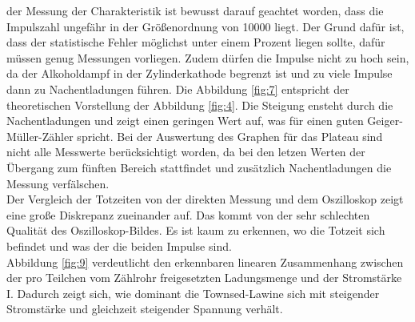 \justifying der Messung der Charakteristik ist bewusst darauf geachtet worden, dass
die Impulszahl ungefähr in der Größenordnung von 10000 liegt. Der Grund dafür ist,
dass der statistische Fehler möglichst unter einem Prozent liegen sollte, dafür müssen genug Messungen
vorliegen. Zudem dürfen die Impulse nicht zu hoch sein, da der Alkoholdampf in der
Zylinderkathode begrenzt ist und zu viele Impulse dann zu Nachentladungen führen.
Die Abbildung \ref{fig:7} entspricht der theoretischen Vorstellung der Abbildung 
\ref{fig:4}. Die Steigung ensteht durch die Nachentladungen und zeigt einen
geringen Wert auf, was für einen guten Geiger-Müller-Zähler spricht.
Bei der Auswertung des Graphen für das Plateau sind nicht alle Messwerte 
berücksichtigt worden, da bei den letzen Werten der Übergang zum
fünften Bereich stattfindet und zusätzlich Nachentladungen die Messung
verfälschen. \\
Der Vergleich der Totzeiten von der direkten Messung und dem Oszilloskop zeigt
eine große Diskrepanz zueinander  auf. Das kommt von der sehr schlechten Qualität
des Oszilloskop-Bildes. Es ist kaum zu erkennen, wo die Totzeit sich befindet
und was der die beiden Impulse sind.\\
\justifying Abbildung \ref{fig:9} verdeutlicht den erkennbaren linearen Zusammenhang
zwischen der pro Teilchen vom Zählrohr freigesetzten Ladungsmenge und 
der Stromstärke I. Dadurch zeigt sich, wie dominant die Townsed-Lawine sich mit
steigender Stromstärke und gleichzeit steigender Spannung verhält.



\newpage
\printbibliography

